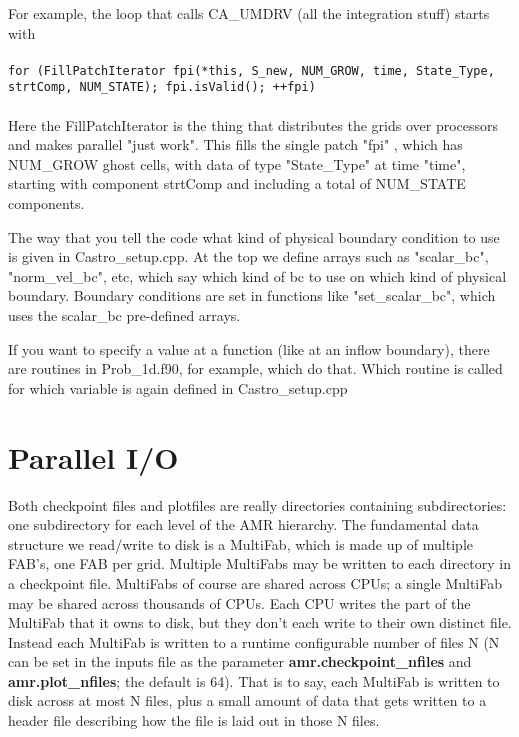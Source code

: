 For example, the loop that calls CA\_UMDRV (all the integration stuff) starts with \\ \\
{\tt       for (FillPatchIterator fpi(*this, S\_new, NUM\_GROW,
                                  time, State\_Type, strtComp, NUM\_STATE);
            fpi.isValid();
            ++fpi)
}\\ \\
Here the FillPatchIterator is the thing that distributes the grids over processors and 
makes parallel "just work". This fills the single patch "fpi" , which has NUM\_GROW 
ghost cells, with data of type "State\_Type" at time "time", starting with component 
strtComp and including a total of NUM\_STATE components.

The way that you tell the code what kind of physical boundary condition to use is given 
in Castro\_setup.cpp. At the top we define arrays such as "scalar\_bc", "norm\_vel\_bc", 
etc, which say which kind of bc to use on which kind of physical boundary. 
Boundary conditions are set in functions like "set\_scalar\_bc", which uses the 
scalar\_bc pre-defined arrays.

If you want to specify a value at a function (like at an inflow boundary), 
there are routines in Prob\_1d.f90, for example, which do that. Which routine is called 
for which variable is again defined in Castro\_setup.cpp 

\section{Parallel I/O}
Both checkpoint files and plotfiles are really directories containing
subdirectories: one subdirectory for each level of the AMR hierarchy.
The fundamental data structure we read/write to disk is a MultiFab,
which is made up of multiple FAB's, one FAB per grid.  Multiple
MultiFabs may be written to each directory in a checkpoint file.
MultiFabs of course are shared across CPUs; a single MultiFab may be
shared across thousands of CPUs.  Each CPU writes the part of the
MultiFab that it owns to disk, but they don't each write to their own
distinct file.  Instead each MultiFab is written to a runtime
configurable number of files N (N can be set in the inputs file as the
parameter {\bf amr.checkpoint\_nfiles} and {\bf amr.plot\_nfiles}; the
default is 64).  That is to say, each MultiFab is written to disk
across at most N files, plus a small amount of data that gets written
to a header file describing how the file is laid out in those N files.

